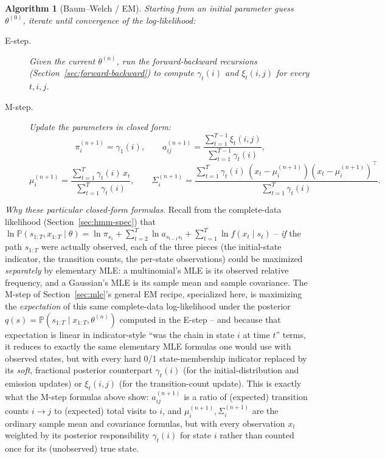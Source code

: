 \documentclass[11pt]{article}
\newtheorem{algorithm}[theorem]{Algorithm}
\theoremstyle{definition}
\theoremstyle{remark}
\begin{document}
\begin{algorithm}[Baum--Welch / EM]
\label{alg:baumwelch}
Starting from an initial parameter guess $\theta^{(0)}$, iterate until convergence of the log-likelihood:
\begin{description}
    \item[E-step.] Given the current $\theta^{(n)}$, run the forward-backward recursions (Section~\ref{sec:forward-backward}) to compute $\gamma_t(i)$ and $\xi_t(i,j)$ for every $t,i,j$.
    \item[M-step.] Update the parameters in closed form:
    \[
    \pi_i^{(n+1)} = \gamma_1(i), \qquad
    a_{ij}^{(n+1)} = \frac{\sum_{t=1}^{T-1}\xi_t(i,j)}{\sum_{t=1}^{T-1}\gamma_t(i)},
    \]
    \[
    \mu_i^{(n+1)} = \frac{\sum_{t=1}^{T}\gamma_t(i)\,x_t}{\sum_{t=1}^{T}\gamma_t(i)}, \qquad
    \Sigma_i^{(n+1)} = \frac{\sum_{t=1}^{T}\gamma_t(i)\,(x_t-\mu_i^{(n+1)})(x_t-\mu_i^{(n+1)})^\top}{\sum_{t=1}^{T}\gamma_t(i)}.
    \]
\end{description}
\end{algorithm}
\emph{Why these particular closed-form formulas.} Recall from the complete-data likelihood (Section~\ref{sec:hmm-spec}) that $\ln\mathbb{P}(s_{1:T},x_{1:T}\mid\theta)=\ln\pi_{s_1}+\sum_{t=2}^T\ln a_{s_{t-1}s_t}+\sum_{t=1}^T\ln f(x_t\mid s_t)$ -- \emph{if} the path $s_{1:T}$ were actually observed, each of the three pieces (the initial-state indicator, the transition counts, the per-state observations) could be maximized \emph{separately} by elementary MLE: a multinomial's MLE is its observed relative frequency, and a Gaussian's MLE is its sample mean and sample covariance. The M-step of Section~\ref{sec:mle}'s general EM recipe, specialized here, is maximizing the \emph{expectation} of this same complete-data log-likelihood under the posterior $q(s)=\mathbb{P}(s_{1:T}\mid x_{1:T},\theta^{(n)})$ computed in the E-step -- and because that expectation is linear in indicator-style ``was the chain in state $i$ at time $t$'' terms, it reduces to exactly the same elementary MLE formulas one would use with observed states, but with every hard 0/1 state-membership indicator replaced by its \emph{soft}, fractional posterior counterpart $\gamma_t(i)$ (for the initial-distribution and emission updates) or $\xi_t(i,j)$ (for the transition-count update). This is exactly what the M-step formulas above show: $a_{ij}^{(n+1)}$ is a ratio of (expected) transition counts $i\to j$ to (expected) total visits to $i$, and $\mu_i^{(n+1)},\Sigma_i^{(n+1)}$ are the ordinary sample mean and covariance formulas, but with every observation $x_t$ weighted by its posterior responsibility $\gamma_t(i)$ for state $i$ rather than counted once for its (unobserved) true state.
\end{document}
